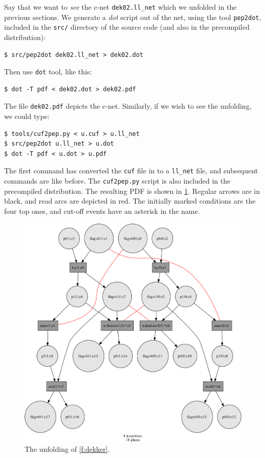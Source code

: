 \documentclass[a4paper]{refart}
\begin{document}
Say that we want to \textit{see} the c-net \verb!dek02.ll_net! which we
unfolded in the previous sections.
We generate a \textit{dot} script out of the net, using the tool
\verb!pep2dot!, included in the \verb!src/! directory of the source code
(and also in the precompiled distribution):
\begin{verbatim}
$ src/pep2dot dek02.ll_net > dek02.dot
\end{verbatim}
Then use \verb!dot! tool, like this:
\begin{verbatim}
$ dot -T pdf < dek02.dot > dek02.pdf
\end{verbatim}
The file \verb!dek02.pdf! depicts the c-net.
Similarly, if we wish to see the unfolding, we could type:
\begin{verbatim}
$ tools/cuf2pep.py < u.cuf > u.ll_net
$ src/pep2dot u.ll_net > u.dot
$ dot -T pdf < u.dot > u.pdf
\end{verbatim}
The first command has converted the \verb!cuf! file in to a
\verb!ll_net! file, and subsequent commands are like before.
The \verb!cuf2pep.py! script is also included in the precompiled
distribution.
The resulting PDF is shown in \cref{f:dek02unf}.
Regular arrows are in black, and read arcs are depicted in red.
The initially marked conditions are the four top ones,
and cut-off events have an asterisk in the name.

\begin{figure}[bt]
\centering
\includegraphics[scale=0.25]{fig/dek02-unf.pdf}
\caption{The unfolding of \cref{f:dekker}.}
\label{f:dek02unf}
\end{figure}
\end{document}
